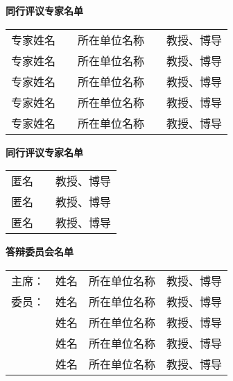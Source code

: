 \begin{titlepage}%
    \null
    \centering
    {\sffamily\fontsize{16bp}{32bp}\selectfont
    \textbf{同行评议专家名单}\par}
    \vskip 1.0cm
    \renewcommand\arraystretch{1.5}
    {\fontsize{16pt}{\baselineskip}\selectfont
        \begin{tabular}{@{}p{4\ccwd}p{1\ccwd}p{9\ccwd}<{\centering}p{1\ccwd}p{6\ccwd}<{\centering}@{}}%
            专家姓名 & & 所在单位名称 & & 教授、博导\\
            专家姓名 & & 所在单位名称 & & 教授、博导\\
            专家姓名 & & 所在单位名称 & & 教授、博导\\
            专家姓名 & & 所在单位名称 & & 教授、博导\\
            专家姓名 & & 所在单位名称 & & 教授、博导
        \end{tabular}\par%
    }
    \vskip 2.4cm%
    {\sffamily\fontsize{16bp}{32bp}\selectfont
    \textbf{同行评议专家名单}\par}%
    \vskip 1.0cm%
    {\fontsize{16bp}{\baselineskip}\selectfont
        \begin{tabular}{@{}p{4\ccwd}p{11\ccwd}p{6\ccwd}<{\centering}@{}}%
            匿名 & & 教授、博导\\
            匿名 & & 教授、博导\\
            匿名 & & 教授、博导
        \end{tabular}\par%
    }
    \vskip 2.4cm%
    {\sffamily\fontsize{16bp}{32bp}\selectfont
    \textbf{答辩委员会名单}\par}%
    \vskip 1.0cm%
    {\fontsize{16bp}{\baselineskip}\selectfont
        \begin{tabular}{@{}p{3\ccwd}p{3\ccwd}<{\centering}p{9\ccwd}p{6\ccwd}<{\centering}@{}}%
            主席： & 姓名 & 所在单位名称 & 教授、博导\\
            委员： & 姓名 & 所在单位名称 & 教授、博导\\
            & 姓名 & 所在单位名称 & 教授、博导\\
            & 姓名 & 所在单位名称 & 教授、博导\\
            & 姓名 & 所在单位名称 & 教授、博导
        \end{tabular}\par%
    }
    \renewcommand\arraystretch{1}
  \end{titlepage}%